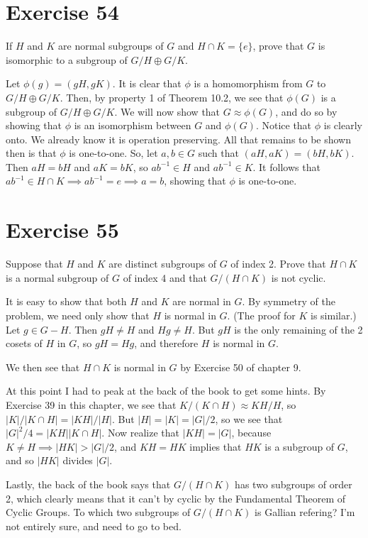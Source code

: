 \documentclass[12pt]{article}
\begin{document}
\section*{Exercise 54}

If $H$ and $K$ are normal subgroups of $G$ and $H\cap K=\{e\}$, prove that $G$
is isomorphic to a subgroup of $G/H\oplus G/K$.

Let $\phi(g)=(gH,gK)$.  It is clear that $\phi$ is a homomorphism from $G$
to $G/H\oplus G/K$.  Then, by property 1 of Theorem 10.2, we see that
$\phi(G)$ is a subgroup of $G/H\oplus G/K$.  We will now show that $G\approx\phi(G)$,
and do so by showing that $\phi$ is an isomorphism between $G$ and $\phi(G)$.
Notice that $\phi$ is clearly onto.  We already know it is operation preserving.
All that remains to be shown then is that $\phi$ is one-to-one.  So, let $a,b\in G$ such that
$(aH,aK)=(bH,bK)$.  Then $aH=bH$ and $aK=bK$, so $ab^{-1}\in H$ and $ab^{-1}\in K$.
It follows that $ab^{-1}\in H\cap K\implies ab^{-1}=e\implies a=b$, showing that
$\phi$ is one-to-one.

\section*{Exercise 55}

Suppose that $H$ and $K$ are distinct subgroups of $G$ of index 2.  Prove that
$H\cap K$ is a normal subgroup of $G$ of index 4 and that $G/(H\cap K)$ is not cyclic.

It is easy to show that both $H$ and $K$ are normal in $G$.  By symmetry of the
problem, we need only show that $H$ is normal in $G$.  (The proof for $K$ is similar.)
Let $g\in G-H$.  Then $gH\neq H$ and $Hg\neq H$.  But $gH$ is the only remaining
of the 2 cosets of $H$ in $G$, so $gH=Hg$, and therefore $H$ is normal in $G$.

We then see that $H\cap K$ is normal in $G$ by Exercise 50 of chapter 9.

At this point I had to peak at the back of the book to get some hints.
By Exercise 39 in this chapter, we see that $K/(K\cap H)\approx KH/H$,
so $|K|/|K\cap H|=|KH|/|H|$.  But $|H|=|K|=|G|/2$, so we see that
$|G|^2/4=|KH||K\cap H|$.  Now realize that $|KH|=|G|$, because $K\neq H\implies |HK|>|G|/2$,
and $KH=HK$ implies that $HK$ is a subgroup of $G$, and so $|HK|$ divides $|G|$.

Lastly, the back of the book says that $G/(H\cap K)$ has two subgroups of order 2,
which clearly means that it can't by cyclic by the Fundamental Theorem of Cyclic Groups.
To which two subgroups of $G/(H\cap K)$ is Gallian refering?  I'm not entirely sure,
and need to go to bed.
\end{document}
